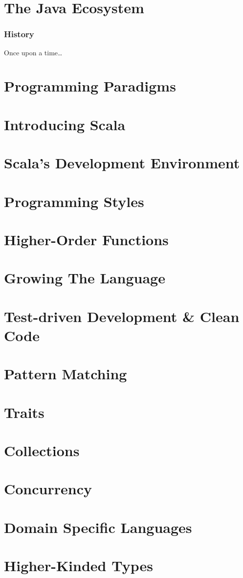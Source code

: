 \part[The Java Ecosystem]{The Java Ecosystem}
\section{History}
\begin{frame}{Once upon a time\ldots}
\end{frame}
\part[Programming Paradigms]{Programming Paradigms}
\part[Introducing Scala]{Introducing Scala}
\part[Scala's Development Environment]{Scala's Development Environment}
\part[Programming Styles]{Programming Styles}
\part[Higher-Order Functions]{Higher-Order Functions}
\part[Growing The Language]{Growing The Language}
\part[TDD \& Clean Code]{Test-driven Development \& Clean Code}
\part[Pattern Matching]{Pattern Matching}
\part[Traits]{Traits}
\part[Collections]{Collections}
\part[Concurrency]{Concurrency}
\part[DSLs]{Domain Specific Languages}
\part[Higher-Kinded Types]{Higher-Kinded Types}
